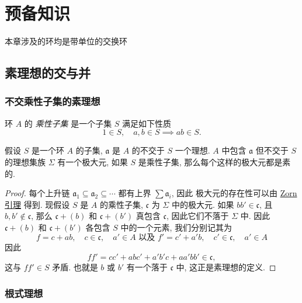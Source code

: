 \chapter{预备知识}

本章涉及的环均是带单位的交换环

\section{素理想的交与并}

\subsection{不交乘性子集的素理想}

环 \( A \) 的 \emph{乘性子集} 是一个子集 \( S \) 满足如下性质
\[
  1 \in S,\quad a, b \in S \implies ab \in S.
\]

\begin{proposition}
  \label{proposition-prime-not-intersect-multiplicative-set}
  假设 \( S \) 是一个环 \( A \) 的子集, \( \mathfrak{a} \) 是 \( A \) 的不交于
  \( S \) 一个理想.  \( A \) 中包含 \( \mathfrak{a} \) 但不交于 \( S \)
  的理想集族 \( \Sigma \) 有一个极大元, 如果 \( S \) 是乘性子集,
  那么每个这样的极大元都是素的.
\end{proposition}
\begin{proof}
  每个上升链 \( \mathfrak{a}_1 \subseteq \mathfrak{a}_2 \subseteq \cdots \)
  都有上界 \( \sum \mathfrak{a}_i \), 因此 极大元的存在性可以由
  \href{https://en.wikipedia.org/wiki/Zorn%27s_lemma}{Zorn 引理} 得到. 现假设 \(
    S \) 是 \( A \) 的乘性子集, \( \mathfrak{c} \) 为 \(
  \Sigma \) 中的极大元. 如果 \( b b' \in \mathfrak{c} \), 且 \( b, b' \notin
  \mathfrak{c} \), 那么 \( \mathfrak{c} + (b) \) 和 \( \mathfrak{c} + (b') \)
  真包含 \( \mathfrak{c} \), 因此它们不落于 \( \Sigma \) 中. 因此 \( \mathfrak{c}
  + (b) \) 和 \( \mathfrak{c} + (b') \) 各包含 \( S \)
  中的一个元素, 我们分别记其为
  \[
    f = c + ab,\quad c \in \mathfrak{c},\quad a' \in A \text{ 以及 } f' = c' +
    a'b,\quad c' \in \mathfrak{c},\quad a' \in A
  \]
  因此
  \[
    f f' = c c' + abc' + a'b'c + aa'bb' \in \mathfrak{c},
  \]
  这与 \( f f' \in S \) 矛盾. 也就是 \( b \) 或 \( b' \) 有一个落于 \(
  \mathfrak{c} \) 中, 这正是素理想的定义.
\end{proof}

\subsection{根式理想}

